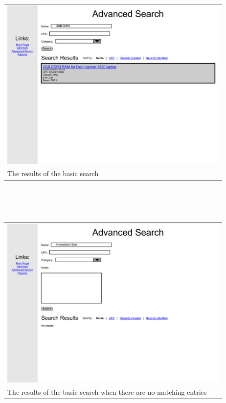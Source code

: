 \documentclass{article}
\begin{document}
\begin{tabular}{ p{4.5in} }
\includegraphics[keepaspectratio, width=4.5in]{basicSearchF0S1.pdf} \\
The results of the basic search
\end{tabular}\\
~\\
~\\
\begin{tabular}{ p{4.5in} }
\includegraphics[keepaspectratio, width=4.5in]{basicSearchF2S1.pdf} \\
The results of the basic search when there are no matching entries
\end{tabular}\\
~\\
~\\
\end{document}
